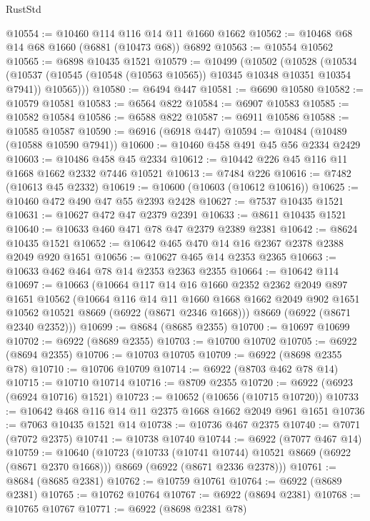 \begin{lexlean}{RustStd}
\begin{coremodule}
@10554 := @10460 @114 @116 @14 @11 @1660 @1662
@10562 := @10468 @68 @14 @68 @1660 (@6881 (@10473 @68)) @6892
@10563 := @10554 @10562
@10565 := @6898 @10435 @1521
@10579 := @10499
    (@10502
      (@10528
        (@10534
          (@10537 (@10545 (@10548 (@10563 @10565)) @10345 @10348 @10351 @10354 @7941))
          @10565)))
@10580 := @6494 @447
@10581 := @6690 @10580
@10582 := @10579 @10581
@10583 := @6564 @822
@10584 := @6907 @10583
@10585 := @10582 @10584
@10586 := @6588 @822
@10587 := @6911 @10586
@10588 := @10585 @10587
@10590 := @6916 (@6918 @447)
@10594 := @10484 (@10489 (@10588 @10590 @7941))
@10600 := @10460 @458 @491 @45 @56 @2334 @2429
@10603 := @10486 @458 @45 @2334
@10612 := @10442 @226 @45 @116 @11 @1668 @1662 @2332 @7446 @10521
@10613 := @7484 @226
@10616 := @7482 (@10613 @45 @2332)
@10619 := @10600 (@10603 (@10612 @10616))
@10625 := @10460 @472 @490 @47 @55 @2393 @2428
@10627 := @7537 @10435 @1521
@10631 := @10627 @472 @47 @2379 @2391
@10633 := @8611 @10435 @1521
@10640 := @10633 @460 @471 @78 @47 @2379 @2389 @2381
@10642 := @8624 @10435 @1521
@10652 := @10642 @465 @470 @14 @16 @2367 @2378 @2388 @2049 @920 @1651
@10656 := @10627 @465 @14 @2353 @2365
@10663 := @10633 @462 @464 @78 @14 @2353 @2363 @2355
@10664 := @10642 @114
@10697 := @10663
    (@10664
      @117
      @14
      @16
      @1660
      @2352
      @2362
      @2049
      @897
      @1651
      @10562
      (@10664
        @116
        @14
        @11
        @1660
        @1668
        @1662
        @2049
        @902
        @1651
        @10562
        @10521
        @8669
        (@6922 (@8671 @2346 @1668)))
      @8669
      (@6922 (@8671 @2340 @2352)))
@10699 := @8684 (@8685 @2355)
@10700 := @10697 @10699
@10702 := @6922 (@8689 @2355)
@10703 := @10700 @10702
@10705 := @6922 (@8694 @2355)
@10706 := @10703 @10705
@10709 := @6922 (@8698 @2355 @78)
@10710 := @10706 @10709
@10714 := @6922 (@8703 @462 @78 @14)
@10715 := @10710 @10714
@10716 := @8709 @2355
@10720 := @6922 (@6923 (@6924 @10716) @1521)
@10723 := @10652 (@10656 (@10715 @10720))
@10733 := @10642 @468 @116 @14 @11 @2375 @1668 @1662 @2049 @961 @1651
@10736 := @7063 @10435 @1521 @14
@10738 := @10736 @467 @2375
@10740 := @7071 (@7072 @2375)
@10741 := @10738 @10740
@10744 := @6922 (@7077 @467 @14)
@10759 := @10640
    (@10723
      (@10733 (@10741 @10744) @10521 @8669 (@6922 (@8671 @2370 @1668)))
      @8669
      (@6922 (@8671 @2336 @2378)))
@10761 := @8684 (@8685 @2381)
@10762 := @10759 @10761
@10764 := @6922 (@8689 @2381)
@10765 := @10762 @10764
@10767 := @6922 (@8694 @2381)
@10768 := @10765 @10767
@10771 := @6922 (@8698 @2381 @78)

\end{coremodule}
\end{lexlean}
